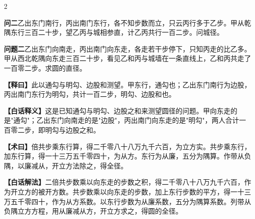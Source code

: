\documentclass[11pt,a4paper]{article}
\newcommand{\WenQuestion}[1]{\textbf{\textcolor{classicalcolor}{#1}}}
\newcommand{\BaiQuestion}[1]{\textbf{\textcolor{moderncolor}{#1}}}
\newcommand{\WenExplain}{\textcolor{classicalcolor}{\textbf{【释曰】}}}
\newcommand{\BaiExplain}{\textcolor{moderncolor}{\textbf{【白话释义】}}}
\newcommand{\WenMethod}{\textcolor{classicalcolor}{\textbf{【术曰】}}}
\newcommand{\BaiMethod}{\textcolor{moderncolor}{\textbf{【白话解法】}}}
\begin{document}
\begin{paracol}{2}
\vspace{0.8em}

\switchcolumn*
\begin{tcolorbox}[colback=red!3,colframe=red!30!black,boxrule=0.3pt]
\WenQuestion{问二}\quad 乙出东门南行，丙出南门东行，各不知步数而立，只云丙行多于乙步。甲从乾隅东行三百二十步，望乙丙与城相参直，计乙丙共行一百二步。问城径。
\end{tcolorbox}
\switchcolumn
\begin{tcolorbox}[colback=blue!3,colframe=blue!30!black,boxrule=0.3pt]
\BaiQuestion{问题二}\quad 乙出东门向南走，丙出南门向东走，各走若干步停下，只知丙走的比乙多。甲从西北乾隅向东走三百二十步，看见乙和丙与城墙在一条直线上，乙和丙共走了一百零二步。求圆的直径。
\end{tcolorbox}

\switchcolumn*
\begin{tcolorbox}[colback=red!5,colframe=red!30!black,boxrule=0.3pt]
\WenExplain\quad 此以通勾与明勾、边股和测望。甲东行，通勾也；乙出东门南行为边股，丙出南门东行为明勾，共计一百二步，明勾、边股和也。
\end{tcolorbox}
\switchcolumn
\begin{tcolorbox}[colback=blue!5,colframe=blue!30!black,boxrule=0.3pt]
\BaiExplain\quad 这是已知通勾与明勾、边股之和来测望圆径的问题。甲向东走的是"通勾"；乙出东门向南走的是"边股"，丙出南门向东走的是"明勾"，两人合计一百零二步，即明勾与边股之和。
\end{tcolorbox}

\switchcolumn*
\begin{tcolorbox}[colback=red!5,colframe=red!40!black,boxrule=0.3pt]
\WenMethod\quad 倍共步乘东行算，得二千零八十八万九千六百，为立方实。共步乘东行，加东行算，得一十三万五千零四十，为从方。东行为从廉，五分为隅算。作带从负隅，以廉减从，开立方法除之，得全径。
\end{tcolorbox}
\switchcolumn
\begin{tcolorbox}[colback=blue!5,colframe=blue!40!black,boxrule=0.3pt]
\BaiMethod\quad 二倍共步数乘以向东走的步数之积，得二千零八十八万九千六百，作为开立方的被开方数。共步数乘以向东走的步数，加上东行步数的平方，得一十三万五千零四十，作为从方系数。以东行步数为从廉系数，五分为隅算系数。列带从负隅立方方程，用从廉减从方，开立方求之，得圆的全径。
\end{tcolorbox}

\end{paracol}

\vspace{0.5em}
\end{document}
